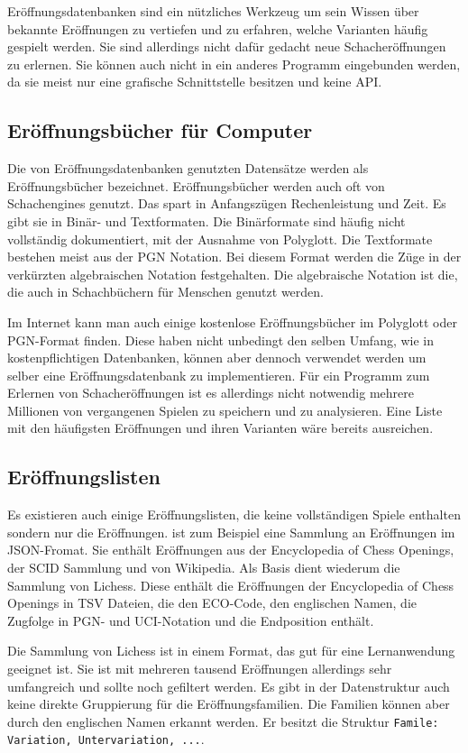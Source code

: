 Eröffnungsdatenbanken sind ein nützliches Werkzeug um sein Wissen über bekannte Eröffnungen zu vertiefen und zu erfahren, welche Varianten häufig gespielt werden. Sie sind allerdings nicht dafür gedacht neue Schacheröffnungen zu erlernen. Sie können auch nicht in ein anderes Programm eingebunden werden, da sie meist nur eine grafische Schnittstelle besitzen und keine \ac{API}.

\subsection{Eröffnungsbücher für Computer}
Die von Eröffnungsdatenbanken genutzten Datensätze werden als Eröffnungsbücher bezeichnet. Eröffnungsbücher werden auch oft von Schachengines genutzt. Das spart in Anfangszügen Rechenleistung und Zeit. Es gibt sie in Binär- und Textformaten. Die Binärformate sind häufig nicht vollständig dokumentiert, mit der Ausnahme von Polyglott. Die Textformate bestehen meist aus der \ac{PGN} Notation.
Bei diesem Format werden die Züge in der verkürzten algebraischen Notation festgehalten. Die algebraische Notation ist die, die auch in Schachbüchern für Menschen genutzt werden.
\cite{wikipedia_foundation_inc_chess_2025}

Im Internet kann man auch einige kostenlose Eröffnungsbücher im Polyglott oder \ac{PGN}-Format finden. Diese haben nicht unbedingt den selben Umfang, wie in kostenpflichtigen Datenbanken, können aber dennoch verwendet werden um selber eine Eröffnungsdatenbank zu implementieren. Für ein Programm zum Erlernen von Schacheröffnungen ist es allerdings nicht notwendig mehrere Millionen von vergangenen Spielen zu speichern und zu analysieren. Eine Liste mit den häufigsten Eröffnungen und ihren Varianten wäre bereits ausreichen.

\subsection{Eröffnungslisten}
Es existieren auch einige Eröffnungslisten, die keine vollständigen Spiele enthalten sondern nur die Eröffnungen. \cite{omur_yanikoglu_ecojson_2025} ist zum Beispiel eine Sammlung an Eröffnungen im JSON-Fromat. Sie enthält Eröffnungen aus der Encyclopedia of Chess Openings, der SCID Sammlung und von Wikipedia. Als Basis dient wiederum die Sammlung \cite{lichessorg_chess-openings_2025} von Lichess. Diese enthält die Eröffnungen der Encyclopedia of Chess Openings in TSV Dateien, die den ECO-Code, den englischen Namen, die Zugfolge in \ac{PGN}- und \ac{UCI}-Notation und die Endposition enthält.

Die Sammlung von Lichess ist in einem Format, das gut für eine Lernanwendung geeignet ist. Sie ist mit mehreren tausend Eröffnungen allerdings sehr umfangreich und sollte noch gefiltert werden. Es gibt in der Datenstruktur auch keine direkte Gruppierung für die Eröffnungsfamilien. Die Familien können aber durch den englischen Namen erkannt werden. Er besitzt die Struktur \lstinline{Famile: Variation, Untervariation, ...}.
